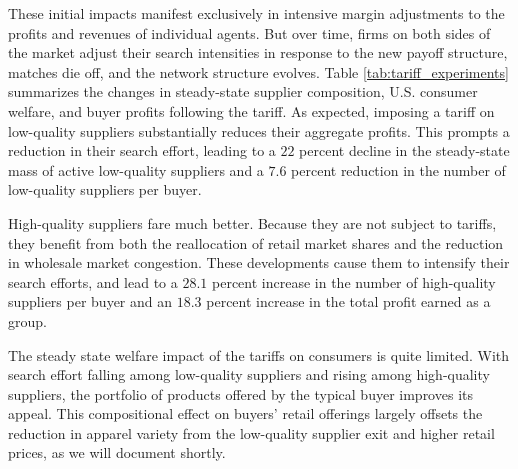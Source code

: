 \documentclass[12pt]{article} \usepackage{amsmath,amssymb,amsthm,geometry,graphicx,setspace,algorithm,algpseudocode,float}
\begin{document}
These initial impacts manifest exclusively in intensive margin adjustments to the profits and revenues of individual agents. But over time, firms on both sides of the market adjust their search intensities in response to the new payoff structure, matches die off, and the network structure evolves.  Table \ref{tab:tariff_experiments} summarizes the changes in steady-state supplier composition, U.S. consumer welfare, and buyer profits following the tariff. As expected, imposing a tariff on low-quality suppliers substantially reduces their aggregate profits. This prompts a reduction in their search effort, leading to a $22$ percent decline in the steady-state mass of active low-quality suppliers and a $7.6$ percent reduction in the number of low-quality suppliers per buyer. 

High-quality suppliers fare much better. Because they are not subject to tariffs, they benefit from both the reallocation of retail market shares and the reduction in wholesale market congestion. These developments cause them to intensify their search efforts, and lead to a $28.1$ percent increase in the number of high-quality suppliers per buyer and an $18.3$ percent increase in the total profit earned as a group. 
\par
The steady state welfare impact of the tariffs on consumers is quite limited. With search effort falling among low-quality suppliers and rising among high-quality suppliers, the portfolio of products offered by the typical buyer improves its appeal. This compositional effect on buyers' retail offerings largely offsets the reduction in apparel variety from the low-quality supplier exit and higher retail prices, as we will document shortly. 


\end{document}
